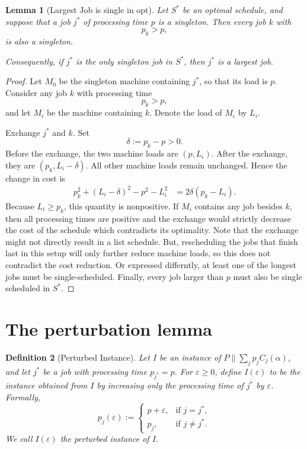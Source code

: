 \documentclass[11pt]{article}
\newtheorem{lemma}{Lemma}
\newtheorem{definition}[lemma]{Definition}
\begin{document}
\begin{lemma}[Largest Job is single in opt]
Let $S^*$ be an optimal schedule, and suppose that a job
$j^*$ of processing time $p$ is a singleton. Then every job $k$
with
\[
    p_k>p,
\]
is also a singleton.

Consequently, if $j^*$ is the only singleton job in $S^*$,
then $j^*$ is a largest job.
\end{lemma}

\begin{proof}
Let $M_0$ be the singleton machine containing $j^*$, so that its
load is $p$.  Consider any job $k$ with processing time
\[
    p_k>p,
\]
and let $M_i$ be the machine containing $k$.  Denote the load of
$M_i$ by $L_i$.

Exchange $j^*$ and $k$.  Set
\[
    \delta:=p_k-p>0.
\]
Before the exchange, the two machine loads are $(p,L_i)$.  After the
exchange, they are $(p_k,L_i-\delta)$.
All other machine loads remain unchanged.  Hence the change in cost is
\begin{align*}
    p_k^2+(L_i-\delta)^2-p^2-L_i^2
      &=2\delta(p_k-L_i).
\end{align*}
Because $L_i\geq p_k$, this quantity is nonpositive.  If $M_i$
contains any job besides $k$, then all processing times are positive
and the exchange would strictly decrease the cost of the schedule which 
contradicts its optimality. 
Note that the exchange might not directly result in a list schedule. 
But, rescheduling the jobs that finish last in this setup will only further 
reduce machine loads, so this does not contradict the cost reduction.
Or expressed differntly, at least one of the longest jobs must be single-scheduled.
Finally, every job larger than $p$ must also be single scheduled in $S^*$.
\end{proof}

\section{The perturbation lemma}

\begin{definition}[Perturbed Instance]
Let $I$ be an instance of
$P\parallel\sum_j p_jC_j(\alpha)$, and let $j^*$ be a job with
processing time $p_{j^*}=p $. For \(\varepsilon\geq 0\), define
\(I(\varepsilon)\) to be the instance obtained from \(I\) by increasing
only the processing time of \(j^*\) by \(\varepsilon\). Formally,
\[
p_j(\varepsilon)
:=
\begin{cases}
p+\varepsilon, & \text{if } j=j^*,\\
p_j,           & \text{if } j\neq j^*.
\end{cases}
\]
We call $I(\varepsilon)$ the perturbed instance of $I$.
\end{definition}
\end{document}
